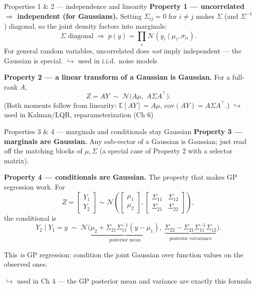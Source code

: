 \documentclass[10pt, aspectratio=169]{beamer}
\newcommand{\usedin}[1]{\hfill{\footnotesize\textcolor{mDarkTeal}{$\hookrightarrow$ used in #1}}}
\begin{document}
\begin{frame}{Properties 1 \& 2 --- independence and linearity}
\textbf{Property 1 --- uncorrelated $\Rightarrow$ independent (for Gaussians).}
Setting $\Sigma_{ij}=0$ for $i\ne j$ makes $\Sigma$ (and $\Sigma^{-1}$) diagonal, so the joint density factors into marginals:
\[
\Sigma \text{ diagonal} \;\Rightarrow\; p(y) = \prod_i \mathcal{N}(y_i\mid \mu_i, \sigma_{ii}).
\]
For general random variables, uncorrelated does \emph{not} imply independent --- the Gaussian is special. \usedin{i.i.d.\ noise models}
\medskip

\pause
\textbf{Property 2 --- a linear transform of a Gaussian is Gaussian.}
For a full-rank $A$,
\[
Z = AY \;\sim\; \mathcal{N}\big(A\mu,\; A\Sigma A^\top\big).
\]
(Both moments follow from linearity: $\mathbb{E}[AY]=A\mu$, $\mathrm{cov}(AY)=A\Sigma A^\top$.) \usedin{Kalman/LQR, reparameterization (Ch 6)}
\end{frame}

\begin{frame}{Properties 3 \& 4 --- marginals and conditionals stay Gaussian}
\textbf{Property 3 --- marginals are Gaussian.} Any sub-vector of a Gaussian is Gaussian; just read off the matching blocks of $\mu, \Sigma$ (a special case of Property 2 with a selector matrix).
\medskip

\pause
\textbf{Property 4 --- conditionals are Gaussian.} The property that makes GP regression work. For
\[
Z = \begin{bmatrix} Y_1\\ Y_2\end{bmatrix} \sim \mathcal{N}\!\left(\begin{bmatrix}\mu_1\\\mu_2\end{bmatrix}, \begin{bmatrix}\Sigma_{11}&\Sigma_{12}\\\Sigma_{21}&\Sigma_{22}\end{bmatrix}\right),
\]
the conditional is
\[
Y_2 \mid Y_1 = y \;\sim\; \mathcal{N}\big(\underbrace{\mu_2 + \Sigma_{21}\Sigma_{11}^{-1}(y-\mu_1)}_{\text{posterior mean}},\; \underbrace{\Sigma_{22}-\Sigma_{21}\Sigma_{11}^{-1}\Sigma_{12}}_{\text{posterior covariance}}\big).
\]
\medskip
\pause
\begin{center}\large
This \emph{is} GP regression: condition the joint Gaussian over function values on the observed ones.
\end{center}
\usedin{Ch 4 --- the GP posterior mean and variance are exactly this formula}
\end{frame}
\end{document}
